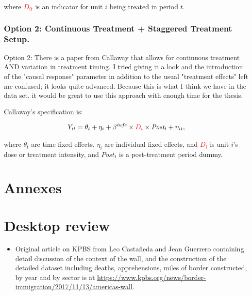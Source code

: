 \documentclass[titlepage]{article}
\begin{document}
where \textcolor{red}{$D_{it}$} is an indicator for unit $i$ being treated in period $t$.

\subsubsection*{Option 2: Continuous Treatment + Staggered Treatment Setup.}

Option 2: There is a paper from Callaway \cite{callaway2021differenceindifferences} that allows for continuous treatment AND variation in treatment timing. I tried giving it a look and the introduction of the "causal response" parameter in addition to the usual "treatment effects" left me confused; it looks quite advanced. Because this is what I think we have in the data set, it would be great to use this approach with enough time for the thesis.

Callaway's specification is:

\begin{equation}
    Y_{it} = \theta_{t} + \eta_{i} + \beta^{\textit{twfe}} \times \textcolor{red}{D_{i}} \times \textit{Post}_{t} + \upsilon_{it},
\end{equation}

where $\theta_{t}$ are time fixed effects, $\eta_{i}$ are individual fixed effects, and \textcolor{red}{$D_{i}$} is unit $i$'s dose or treatment intensity, and $Post_{t}$ is a post-treatment period dummy.


\newpage
\printbibliography[
heading=bibintoc,
title={References}]


\appendix
{}
\section*{Annexes}

\section{Desktop review}

\begin{itemize}
    \item Original article on KPBS from Leo Castañeda and Jean Guerrero containing detail discussion of the context of the wall, and the construction of the detailed dataset including deaths, apprehensions, miles of border constructed, by year and by sector is at \newline \href{https://www.kpbs.org/news/border-immigration/2017/11/13/americas-wall}{https://www.kpbs.org/news/border-immigration/2017/11/13/americas-wall}.
\end{itemize}
\end{document}
